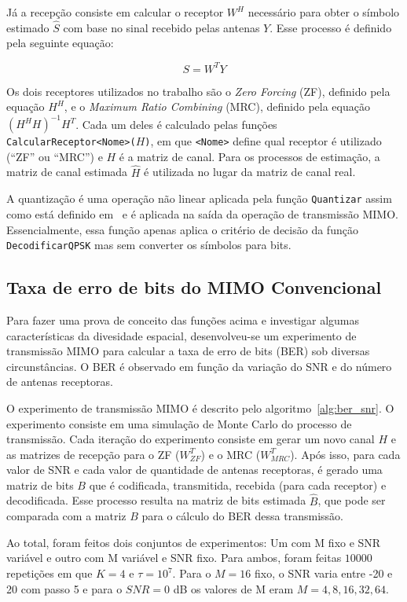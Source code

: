 \documentclass{article}
\begin{document}
Já a recepção consiste em calcular o receptor $W^H$ necessário para obter o símbolo estimado $\hat{S}$ com base no sinal recebido pelas antenas $Y$. Esse processo é definido pela seguinte equação:

\begin{equation}
    S = W^TY
\end{equation}

Os dois receptores utilizados no trabalho são o \textit{Zero Forcing} (ZF), definido pela equação $H^{H}$, e o \textit{Maximum Ratio Combining} (MRC), definido pela equação $(H^HH)^{-1}H^T$. Cada um deles é calculado pelas funções \texttt{CalcularReceptor<Nome>($H$)}, em que \texttt{<Nome>} define qual receptor é utilizado (``ZF'' ou ``MRC'') e $H$ é a matriz de canal. Para os processos de estimação, a matriz de canal estimada $\hat{H}$ é utilizada no lugar da matriz de canal real.

A quantização é uma operação não linear aplicada pela função \texttt{Quantizar} assim como está definido em~\cite[eq. 2]{li.etal_2017a} e é aplicada na saída da operação de transmissão MIMO. Essencialmente, essa função apenas aplica o critério de decisão da função \texttt{DecodificarQPSK} mas sem converter os símbolos para bits. 

\subsection{Taxa de erro de bits do MIMO Convencional}

Para fazer uma prova de conceito das funções acima e investigar algumas características da divesidade espacial, desenvolveu-se um experimento de transmissão MIMO para calcular a taxa de erro de bits (BER) sob diversas circunstâncias. O BER é observado em função da variação do SNR e do número de antenas receptoras. 

O experimento de transmissão MIMO é descrito pelo algoritmo~\ref{alg:ber_snr}. O experimento consiste em uma simulação de Monte Carlo do processo de transmissão. Cada iteração do experimento consiste em gerar um novo canal $H$ e as matrizes de recepção para o ZF ($W^T_{ZF}$) e o MRC ($W^T_{MRC}$). Após isso, para cada valor de SNR e cada valor de quantidade de antenas receptoras, é gerado uma matriz de bits $B$ que é codificada, transmitida, recebida (para cada receptor) e decodificada. Esse processo resulta na matriz de bits estimada $\hat{B}$, que pode ser comparada com a matriz $B$ para o cálculo do BER dessa transmissão. 

Ao total, foram feitos dois conjuntos de experimentos: Um com M fixo e SNR variável e outro com M variável e SNR fixo. Para ambos, foram feitas $10000$ repetições em que $K=4$ e $\tau=10^7$. Para o $M=16$ fixo, o SNR varia entre -20 e 20 com passo 5 e para o $SNR = 0$ dB os valores de M eram $M={4,8,16,32,64}$. 
\end{document}
